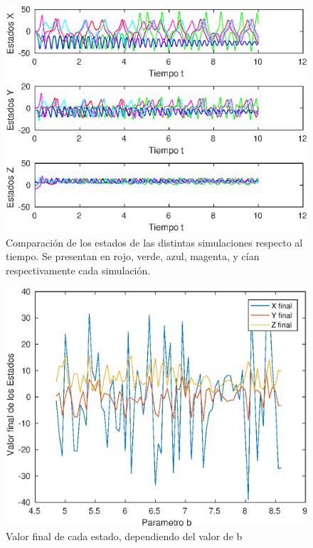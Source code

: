 \documentclass[12pt,letterpaper]{article}
\begin{document}
\begin{figure}
	\centering
	\includegraphics[width=\textwidth]{pictures/comparacion}
	\caption{Comparación de los estados de las distintas simulaciones respecto al tiempo. Se presentan en rojo, verde, azul, magenta, y cían respectivamente cada simulación.}
	\label{fig:comparacion}
\end{figure}


\begin{figure}
	\centering
	\includegraphics[width=\textwidth]{pictures/sensibilidad}
	\caption{Valor final de cada estado, dependiendo del valor de b}
	\label{fig:sensibilidad}
\end{figure}
\end{document}
